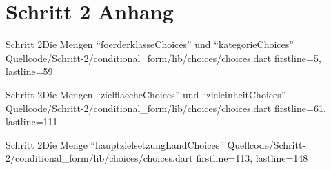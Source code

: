 \chapter{Schritt 2 Anhang} 
\label{appendix:Schritt2Anhang}

\begin{alexlisting}{Schritt 2}{Die Mengen \enquote{foerderklasseChoices} und \enquote{kategorieChoices}}
    {Quellcode/Schritt-2/conditional_form/lib/choices/choices.dart}
    {firstline=5, lastline=59}
    \label{lst:Schritt2FoerderklasseChoicesKategorieChoices}
\end{alexlisting}

\begin{alexlisting}{Schritt 2}{Die Mengen \enquote{zielflaecheChoices} und \enquote{zieleinheitChoices}}
    {Quellcode/Schritt-2/conditional_form/lib/choices/choices.dart}
    {firstline=61, lastline=111}
    \label{lst:Schritt2ZielflaecheChoicesZieleinheitChoices}
\end{alexlisting}

\begin{alexlisting}{Schritt 2}{Die Menge \enquote{hauptzielsetzungLandChoices}}
    {Quellcode/Schritt-2/conditional_form/lib/choices/choices.dart}
    {firstline=113, lastline=148}
    \label{lst:Schritt2hauptzielsetzungLandChoices}
\end{alexlisting}